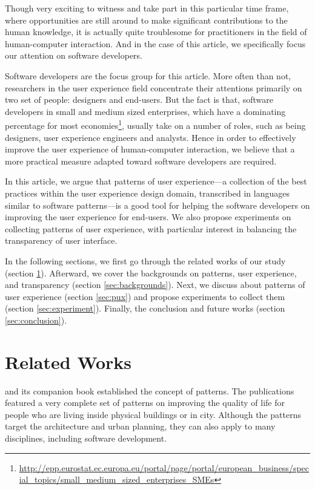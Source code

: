 \documentclass[a4paper,titlepage]{article}
\begin{document}
Though very exciting to witness and take part in this particular time
frame, where opportunities are still around to make significant
contributions to the human knowledge, it is actually quite troublesome
for practitioners in the field of human-computer interaction. And in
the case of this article, we specifically focus our attention on
software developers.

Software developers are the focus group for this article. More often
than not, researchers in the user experience field concentrate their
attentions primarily on two set of people: designers and
end-users. But the fact is that, software developers in small and
medium sized enterprises, which have a dominating percentage for most
economies\footnote{\url{http://epp.eurostat.ec.europa.eu/portal/page/portal/european_business/special_topics/small_medium_sized_enterprises_SMEs}},
usually take on a number of roles, such as being designers, user
experience engineers and analysts. Hence in order to effectively
improve the user experience of human-computer interaction, we believe
that a more practical measure adapted toward software developers are
required.

In this article, we argue that patterns of user experience---a
collection of the best practices within the user experience design
domain, transcribed in languages similar to software patterns---is a
good tool for helping the software developers on improving the user
experience for end-users. We also propose experiments on collecting
patterns of user experience, with particular interest in balancing the
transparency of user interface.

In the following sections, we first go through the related works of
our study (section \ref{sec:related}). Afterward, we cover the
backgrounds on patterns, user experience, and transparency (section
\ref{sec:backgrounds}). Next, we discuss about patterns of user
experience (section \ref{sec:pux}) and propose experiments to collect
them (section \ref{sec:experiment}). Finally, the conclusion and
future works (section \ref{sec:conclusion}).


\section{Related Works}
\label{sec:related}
\citet{language:alexander} and its companion book
\citet{timeless:alexander} established the concept of patterns. The
publications featured a very complete set of patterns on improving the
quality of life for people who are living inside physical buildings or
in city. Although the patterns target the architecture and urban
planning, they can also apply to many disciplines, including software
development.
\end{document}
